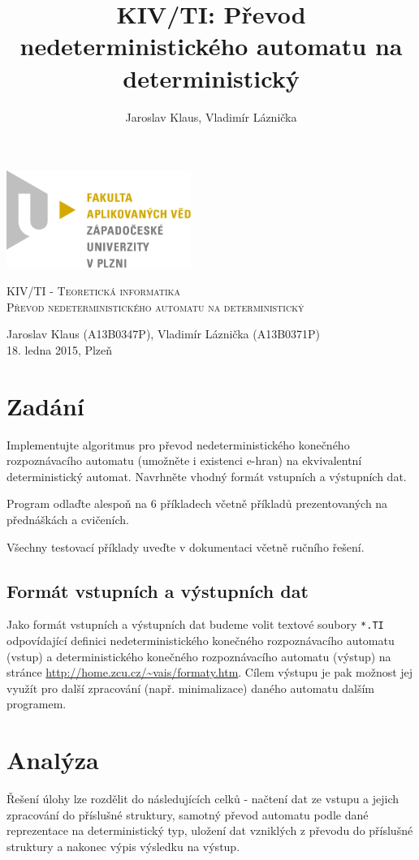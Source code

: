 \documentclass[11pt]{article}
\title{KIV/TI: Převod nedeterministického automatu na deterministický}
\author{Jaroslav Klaus, Vladimír Láznička}
\begin{document}
\begin{titlepage}
\includegraphics[width = 6cm]{logo_fav.jpg}
\begin{center}
\vfill
\textsc{\large KIV/TI - Teoretická informatika}\\
\textsc{\LARGE Převod nedeterministického automatu na deterministický}
\\[0.2cm]
\end{center}
\vfill
Jaroslav Klaus (A13B0347P), Vladimír Láznička (A13B0371P)
\\[0.2cm]
18. ledna 2015,  Plzeň
\end{titlepage}

\tableofcontents

\newpage

\section{Zadání}
Implementujte algoritmus pro převod nedeterministického konečného rozpoznávacího automatu (umožněte i existenci e-hran) na ekvivalentní deterministický automat. Navrhněte vhodný formát vstupních a výstupních dat.

Program odlaďte alespoň na 6 příkladech včetně příkladů prezentovaných na přednáškách a cvičeních.

Všechny testovací příklady uveďte v dokumentaci včetně ručního řešení.

\subsection{Formát vstupních a výstupních dat}
Jako formát vstupních a výstupních dat budeme volit textové soubory \texttt{*.TI} odpovídající definici nedeterministického konečného rozpoznávacího automatu (vstup) a deterministického konečného rozpoznávacího automatu (výstup) na stránce \url{http://home.zcu.cz/~vais/formaty.htm}. Cílem výstupu je pak možnost jej využít pro další zpracování (např. minimalizace) daného automatu dalším programem.

\newpage

\section{Analýza}
Řešení úlohy lze rozdělit do následujících celků - načtení dat ze vstupu a jejich zpracování do příslušné struktury, samotný převod automatu podle dané reprezentace na deterministický typ, uložení dat vzniklých z převodu do příslušné struktury a nakonec výpis výsledku na výstup.
\end{document}
